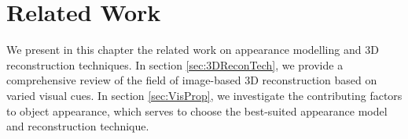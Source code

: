 
\chapter{Related Work}
\label{ch:RelatedWork}

We present in this chapter the related work on appearance modelling and 3D reconstruction techniques. In section \ref{sec:3DReconTech}, we provide a comprehensive review of the field of image-based 3D reconstruction based on varied visual cues. In section \ref{sec:VisProp}, we investigate the contributing factors to object appearance, which serves to choose the best-suited appearance model and reconstruction technique.


